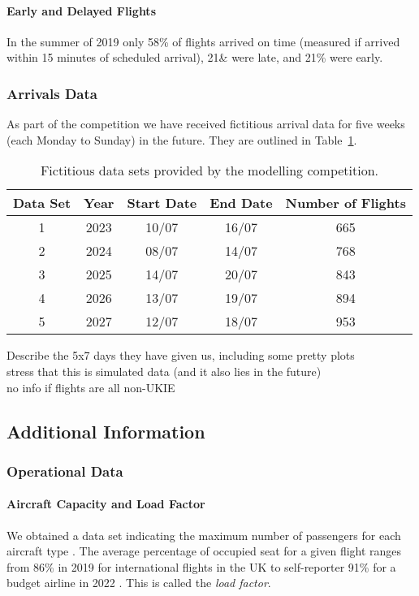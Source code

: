 \documentclass[10pt]{article}
\begin{document}
\paragraph{Early and Delayed Flights}
In the summer of 2019 only 58\% of flights arrived on time (measured if arrived within 15 minutes of scheduled arrival), 21\& were late, and 21\% were early. 

\subsubsection{Arrivals Data}
As part of the competition we have received fictitious arrival data for five weeks (each Monday to Sunday) in the future. They are outlined in Table~\ref{tab_comdat_overview}.

\begin{table}[]
\caption{Fictitious data sets provided by the modelling competition.}
\label{tab_comdat_overview}
\centering
\begin{tabular}{ccccc}
\hline
\multicolumn{1}{c}{\textbf{Data Set}} & \textbf{Year} & \textbf{Start Date} & \textbf{End Date} & \textbf{Number of Flights} \\ \hline
1  & 2023  & 10/07  & 16/07     & 665   \\
2  & 2024  & 08/07  & 14/07     & 768   \\
3  & 2025  & 14/07  & 20/07     & 843   \\
4  & 2026  & 13/07  & 19/07     & 894   \\
5  & 2027  & 12/07  & 18/07     & 953   \\ \hline
\end{tabular}
\end{table}


Describe the 5x7 days they have given us, including some pretty plots \\
stress that this is simulated data (and it also lies in the future) \\
no info if flights are all non-UKIE


\subsection{Additional Information}


\subsubsection{Operational Data}

\paragraph{Aircraft Capacity and Load Factor}
We obtained a data set indicating the maximum number of passengers for each aircraft type \cite{aircraft_capacity}. The average percentage of occupied seat for a given flight ranges from 86\% in 2019 for international flights in the UK \cite{loading_factor_national} to self-reporter 91\% for a budget airline in 2022 \cite{loading_factor_ryanair}. This is called the \textit{load factor}.
\end{document}

